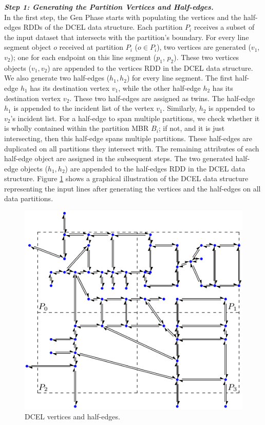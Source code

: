\vspace{4pt}
\textit{\textbf{Step 1: Generating the Partition Vertices and Half-edges.}}
\\
In the first step, the Gen Phase starts with populating the vertices and the half-edges RDDs of the DCEL data structure.
Each partition $P_i$ receives a subset of the input dataset that intersects with the partition's boundary.
For every line segment object $o$ received at partition $P_i$ ($o \in P_i$), two vertices are generated ($v_1$, $v_2$); one for each endpoint on this line segment ($p_1$, $p_2$). These two vertices objects ($v_1, v_2$) are appended to the vertices RDD in the DCEL data structure.
We also generate two half-edges ($h_1, h_2$) for every line segment. 
The first half-edge $h_1$ has its destination vertex $v_1$, while the other half-edge $h_2$ has its destination vertex $v_2$. These two half-edges are assigned as twins.
The half-edge $h_1$ is appended to the incident list of the vertex $v_1$. Similarly, $h_2$ is appended to $v_2$'s incident list.
For a half-edge to span multiple partitions, we check whether it is wholly contained within the partition MBR $B_i$; if not, and it is just intersecting, then this half-edge spans multiple partitions. 
These half-edges are duplicated on all partitions they intersect with.
The remaining attributes of each half-edge object are assigned in the subsequent steps. 
The two generated half-edge objects ($h_1, h_2$) are appended to the half-edges RDD in the DCEL data structure.
Figure \ref{fig:ddcel:step1} shows a graphical illustration of the DCEL data structure representing the input lines after generating the vertices and the 
half-edges on all data partitions.

\begin{figure}[tb]
	\centering
	\includegraphics[width=0.75 \linewidth ]{chapter2/model/ddcel-1}
	\caption{DCEL vertices and half-edges.}
	\label{fig:ddcel:step1}
\end{figure}


